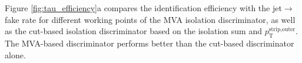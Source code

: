 \begin{itemize}
\end{itemize}

Figure \ref{fig:tau_efficiency}a compares the \Pgth identification efficiency with the
jet$\rightarrow$\Pgth fake rate for different working points of the
MVA isolation discriminator, as well as the cut-based isolation discriminator based
on the isolation sum and $p_{\text{T}}^{\text{strip,outer}}$. The MVA-based 
discriminator performs better than the cut-based discriminator alone.


